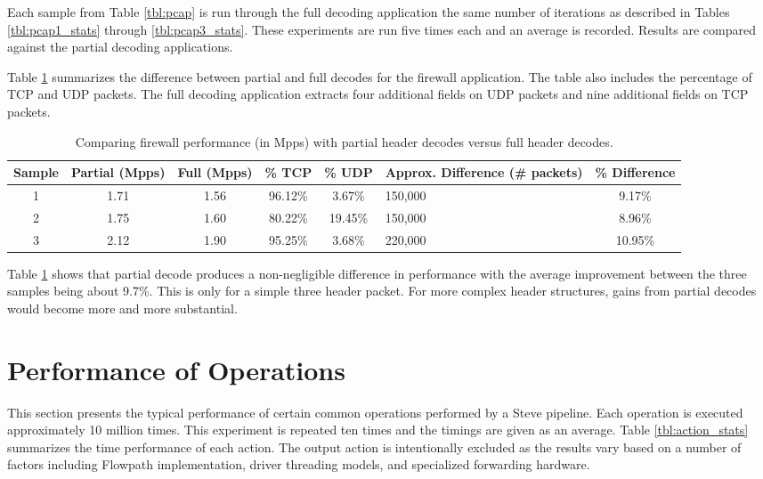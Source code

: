 Each sample from Table \ref{tbl:pcap} is run through the full decoding application the same number of iterations as described in Tables \ref{tbl:pcap1_stats} through \ref{tbl:pcap3_stats}. These experiments are run five times each and an average is recorded. Results are compared against the partial decoding applications.

Table \ref{tbl:firewall_cmp} summarizes the difference between partial and full decodes for the firewall application. The table also includes the percentage of TCP and UDP packets. The full decoding application extracts four additional fields on UDP packets and nine additional fields on TCP packets. 

\begin{table}
\caption{Comparing firewall performance (in Mpps) with partial header decodes versus full header decodes.}
\begin{center}
\begin{tabularx}{\linewidth}{| c || c | c | c | c | X | c |}
\hline
Sample & Partial (Mpps) & Full (Mpps) & \% TCP & \% UDP & Approx. Difference (\# packets) & \% Difference \\
\hline
1 & 1.71 & 1.56 & 96.12\% & 3.67\% & 150,000 & 9.17\% \\
\hline
2 & 1.75 & 1.60 & 80.22\% & 19.45\% & 150,000 & 8.96\% \\
\hline
3 & 2.12 & 1.90 & 95.25\% & 3.68\% & 220,000 & 10.95\% \\ 
\hline
\end{tabularx}
\end{center}
\label{tbl:firewall_cmp}
\end{table}


Table \ref{tbl:firewall_cmp} shows that partial decode produces a non-negligible difference in performance with the average improvement between the three samples being about 9.7\%. This is only for a simple three header packet. For more complex header structures, gains from partial decodes would become more and more substantial.


\section{Performance of Operations} \label{exp:action_performance}

This section presents the typical performance of certain common operations performed by a Steve pipeline. Each operation is executed approximately 10 million times. This experiment is repeated ten times and the timings are given as an average. Table \ref{tbl:action_stats} summarizes the time performance of each action. The output action is intentionally excluded as the results vary based on a number of factors including Flowpath implementation, driver threading models, and specialized forwarding hardware.

